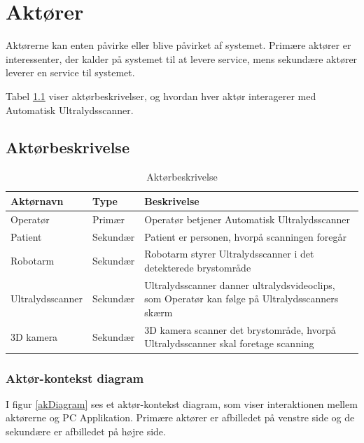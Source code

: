 \chapter{Aktører}\label{Aktorer}

Aktørerne kan enten påvirke eller blive påvirket af systemet. Primære aktører er interessenter, der kalder på systemet til at levere service, mens sekundære aktører leverer en service til systemet. 

Tabel \ref{Beskriv} viser aktørbeskrivelser, og hvordan hver aktør interagerer med Automatisk Ultralydsscanner. 

\section{Aktørbeskrivelse}
\begin{table}[htb]
\begin{tabular}{|l|l|p{}| }
  \hline
  \textbf{Aktørnavn} & \textbf{Type} & \textbf{Beskrivelse} \\ \hline
  Operatør & Primær & Operatør betjener Automatisk Ultralydsscanner 
  \\ \hline
  Patient & Sekundær & Patient er personen, hvorpå scanningen foregår \\ \hline
  Robotarm & Sekundær & Robotarm styrer Ultralydsscanner i det detekterede brystområde \\ \hline
Ultralydsscanner & Sekundær & Ultralydsscanner danner ultralydsvideoclips, som Operatør kan følge på Ultralydsscanners skærm\\ \hline
  3D kamera & Sekundær & 3D kamera scanner det brystområde, hvorpå Ultralydsscanner skal foretage scanning \\ \hline 
\end{tabular}
\caption{Aktørbeskrivelse}
\label{Beskriv}
\end{table}
\newpage

\subsection{Aktør-kontekst diagram}
I figur \ref{akDiagram} ses et aktør-kontekst diagram, som viser interaktionen mellem aktørerne og PC Applikation. Primære aktører er afbilledet på venstre side og de sekundære er afbilledet på højre side.

